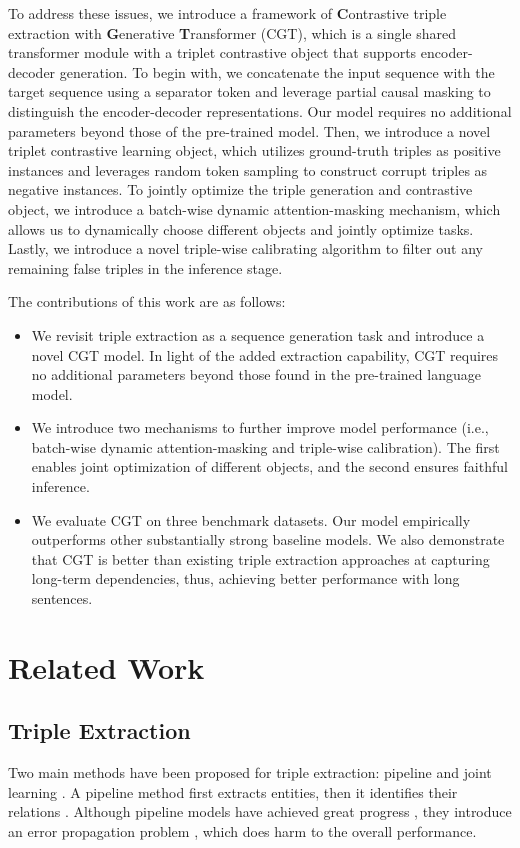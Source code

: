 \documentclass[letterpaper]{article} \usepackage{aaai21}  \usepackage{times}  \usepackage{helvet} \usepackage{courier}  \usepackage[hyphens]{url}  \usepackage{graphicx} \urlstyle{rm} \def\UrlFont{\rm}  \usepackage{natbib}  \usepackage[noend]{algpseudocode}
\begin{document}
To address these issues, we introduce a framework of \textbf{C}ontrastive triple extraction with \textbf{G}enerative \textbf{T}ransformer (CGT), which is a single shared transformer module with a triplet contrastive object that supports encoder-decoder generation. To begin with, we concatenate the input sequence with the target sequence using a separator token and leverage partial causal masking \cite{du2020document} to distinguish the encoder-decoder representations. Our model requires no additional parameters beyond those of the pre-trained model. Then, we introduce a novel triplet contrastive learning object, which utilizes ground-truth triples as positive instances and leverages random token sampling to construct corrupt triples as negative instances. To jointly optimize the triple generation and contrastive object, we introduce a batch-wise dynamic attention-masking mechanism, which allows us to dynamically choose different objects and jointly optimize tasks. Lastly, we introduce a novel triple-wise calibrating algorithm to filter out any remaining false triples in the inference stage. 

The contributions of this work are as follows: 
\begin{itemize}
    \item We revisit triple extraction as a sequence generation task and introduce a novel CGT model. In light of the added extraction capability, CGT requires no additional parameters beyond those found in the pre-trained language model.
    \item We introduce two mechanisms to further improve model performance (i.e., batch-wise dynamic attention-masking and triple-wise calibration). The first enables joint optimization of different objects, and the second ensures faithful inference.
    \item We evaluate CGT on three benchmark datasets. Our model empirically outperforms other substantially strong baseline models. We also demonstrate that CGT is better than existing triple extraction approaches at capturing long-term dependencies, thus, achieving better performance with long sentences.
\end{itemize}
 
\section{Related Work}
\subsection{Triple Extraction}
Two main methods have been proposed for triple extraction: pipeline \cite{Nadeau2007ASO,bunescu2005shortest,lin2016neural,lin2017neural,li-etal-2020-logic,wang2020finding} and joint learning \cite{miwa2016end,katiyar2017going,cao-etal-2017-bridge,zhang-etal-2020-openue,dai2019joint}. A pipeline method first extracts entities, then it identifies their relations \cite{hendrickx2019semeval,zeng2015distant}. Although pipeline models have achieved great progress \cite{zhang2018capsule,he2018see,zhang2019long,zhang2020relation}, they introduce an error propagation problem \cite{li2014incremental}, which does harm to the overall performance.
\end{document}
